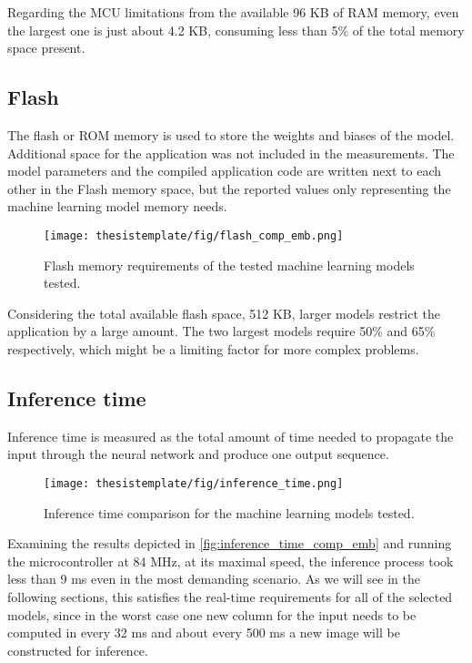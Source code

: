 Regarding the MCU limitations from the available 96 KB of RAM memory, even the largest one is just about 4.2 KB, consuming less than 5\% of the total memory space present.

\subsection{Flash}

The flash or ROM memory is used to store the weights and biases of the model. Additional space for the application was not included in the measurements. The model parameters and the compiled application code are written next to each other in the Flash memory space, but the reported values only representing the machine learning model memory needs.


\begin{figure}[h!]
  \begin{center}
    \texttt{[image: thesistemplate/fig/flash\_comp\_emb.png]}
    \caption{Flash memory requirements of the tested machine learning models tested.}
    \label{fig:flash_comp_emb}
  \end{center}
\end{figure}

Considering the total available flash space, 512 KB, larger models restrict the application by a large amount. The two largest models require 50\% and 65\% respectively, which might be a limiting factor for more complex problems.

\subsection{Inference time}

Inference time is measured as the total amount of time needed to propagate the input through the neural network and produce one output sequence.

\begin{figure}[h!]
  \begin{center}
    \texttt{[image: thesistemplate/fig/inference\_time.png]}
    \caption{Inference time comparison for the machine learning models tested.}
    \label{fig:inference_time_comp_emb}
  \end{center}
\end{figure}

Examining the results depicted in \autoref{fig:inference_time_comp_emb} and running the microcontroller at 84 MHz, at its maximal speed, the inference process took less than 9 ms even in the most demanding scenario. As we will see in the following sections, this satisfies the real-time requirements for all of the selected models, since in the worst case one new column for the input needs to be computed in every 32 ms and about every 500 ms a new image will be constructed for inference.

